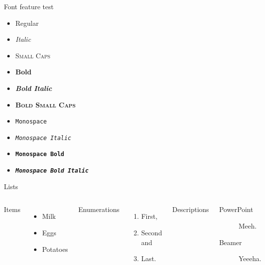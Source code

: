\documentclass[10pt]{beamer}
\begin{document}
\begin{frame}{Font feature test}
  \begin{itemize}
    \item Regular
    \item \textit{Italic}
    \item \textsc{Small Caps}
    \item \textbf{Bold}
    \item \textbf{\textit{Bold Italic}}
    \item \textbf{\textsc{Bold Small Caps}}
    \item \texttt{Monospace}
    \item \texttt{\textit{Monospace Italic}}
    \item \texttt{\textbf{Monospace Bold}}
    \item \texttt{\textbf{\textit{Monospace Bold Italic}}}
  \end{itemize}
\end{frame}

\begin{frame}{Lists}
  \begin{columns}[T,onlytextwidth]
      Items
      \begin{itemize}
        \item Milk \item Eggs \item Potatoes
      \end{itemize}

      Enumerations
      \begin{enumerate}
        \item First, \item Second and \item Last.
      \end{enumerate}

      Descriptions
      \begin{description}
        \item[PowerPoint] Meeh. \item[Beamer] Yeeeha.
      \end{description}
  \end{columns}
\end{frame}
\end{document}
